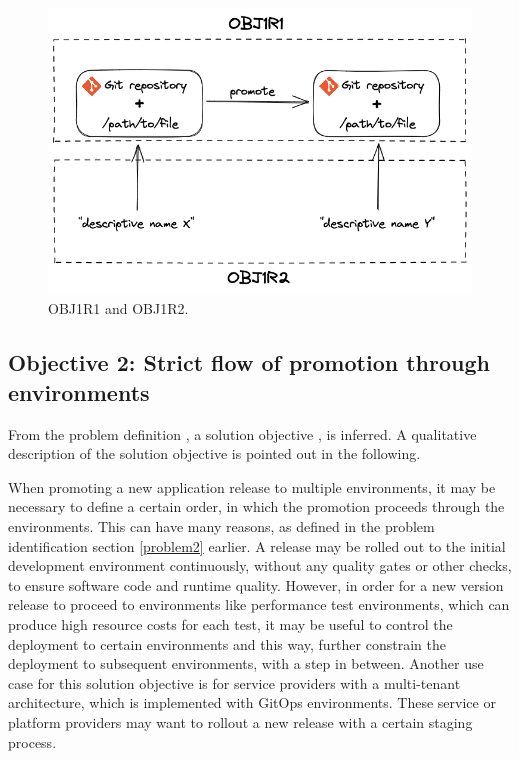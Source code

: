 \begin{figure}[h]
	\centering
	\includegraphics[width=0.79\linewidth]{assets/OBJ1R1-and-OBJ1R2.png}
	\caption{OBJ1R1 and OBJ1R2.
	}
	\label{fig:OBJ1R1-and-OBJ1R2}	
\end{figure}

\subsection{Objective 2: Strict flow of promotion through environments}
\label{objective2}

From the problem definition
\textbf{},
a solution objective
\textbf{},
is inferred.
A qualitative description of the solution objective
is pointed out in the following.

When promoting a new application release to multiple environments,
it may be necessary to define a certain order, in which the promotion proceeds
through the environments.
This can have many reasons,
as defined in the problem identification section \ref{problem2} earlier.
A release may be rolled out to the initial development environment continuously,
without any quality gates or other checks, to ensure software code and runtime quality.
However, in order for a new version release to proceed to environments like
performance test environments, which can produce high resource costs for each test,
it may be useful to control the deployment to certain environments and this way, further constrain
the deployment to subsequent environments, with a step in between.
Another use case for this solution objective is for service providers
with a multi-tenant architecture, which is implemented with GitOps environments.
These service or platform providers may want to rollout a new release with a certain staging process.

